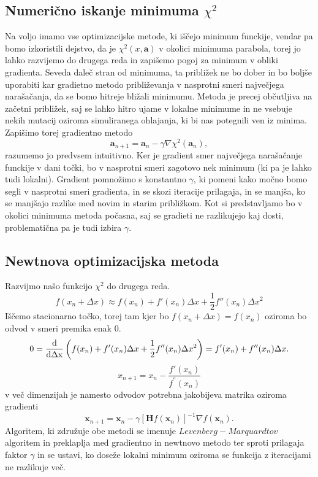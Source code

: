 \documentclass[11pt, a4paper]{article}
\renewcommand{\vec}[1]{\mathbf{#1}}
\begin{document}
\subsection{Numerično iskanje minimuma $\chi^2$}
Na voljo imamo vse optimizacijske metode, ki iščejo minimum funckije, vendar pa bomo izkoristili dejstvo, da je $\chi^2(x,\vec{a})$ v okolici minimuma parabola, torej jo lahko razvijemo do drugega reda in zapišemo pogoj za minimum v obliki gradienta. Seveda daleč stran od minimuma, ta približek ne bo dober in bo boljše uporabiti kar gradietno metodo približevanja v nasprotni smeri največjega narašačanja, da se bomo hitreje bližali minimumu. Metoda je precej občutljiva na začetni približek, saj se lahko hitro ujame v lokalne minimume in ne vsebuje nekih mutacij oziroma simuliranega ohlajanja, ki bi nas potegnili ven iz minima. Zapišimo torej gradientno metodo
\begin{equation}
 \mathbf {a} _{n+1}=\mathbf {a} _{n}-\gamma \nabla \chi^2(\mathbf {a} _{n}),
 \end{equation}
razumemo jo predvsem intuitivno. Ker je gradient smer največjega narašačanje funckije v dani točki, bo v nasprotni smeri zagotovo nek minimum (ki pa je lahko tudi lokalni). Gradient pomnožimo s konstantno $\gamma$, ki pomeni kako močno bomo segli v nasprotni smeri gradienta, in se skozi iteracije prilagaja, in se manjša, ko se manjšajo razlike med novim in starim približkom. Kot si predstavljamo bo v okolici minimuma metoda počasna, saj se gradieti ne razlikujejo kaj dosti, problematična pa je tudi izbira $\gamma$. \newline\newline
\subsection{Newtnova optimizacijska metoda}
Razvijmo našo funkcijo $\chi^2$ do drugega reda.
\begin{equation}
f(x_{n}+\Delta x)\approx f(x_{n})+f'(x_{n})\Delta x+{\frac {1}{2}}f''(x_{n})\Delta x^{2}
\end{equation}
Iščemo stacionarno točko, torej tam kjer bo $ f(x_{n}+\Delta x) = f(x_{n})$ oziroma bo odvod v smeri premika enak 0.
\begin{equation}
 0={\frac {\rm {d}}{\rm {d\Delta x}}}\left(f(x_{n})+f'(x_{n})\Delta x+{\frac {1}{2}}f''(x_{n})\Delta x^{2}\right)=f'(x_{n})+f''(x_{n})\Delta x.
\end{equation}
\begin{equation}
 x_{n+1} = x_n - \frac{f'(x_n)}{f^{''}(x_n)}
\end{equation}
v več dimenzijah je namesto odvodov potrebna jakobijeva matrika oziroma gradienti 
\begin{equation}
\mathbf {x} _{n+1}=\mathbf {x} _{n}-\gamma [\mathbf {H} f(\mathbf {x} _{n})]^{-1}\nabla f(\mathbf {x} _{n}).
\end{equation}
Algoritem, ki združuje obe metodi se imenuje $Levenberg-Marquardtov$ algoritem in preklaplja med gradientno in newtnovo metodo ter sproti prilagaja faktor $\gamma$ in se ustavi, ko doseže lokalni minimum oziroma se funkcija z iteracijami ne razlikuje več.
\end{document}
